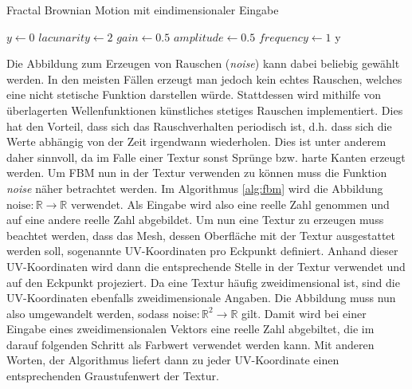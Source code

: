 \begin{algorithm}
  \caption{Fractal Brownian Motion mit eindimensionaler Eingabe}
  \label{alg:fbm}
  \SetAlgoLined


  \BlankLine
  $y \leftarrow 0$\;
  $\mathit{lacunarity}\leftarrow 2$\;
  $\mathit{gain}\leftarrow 0.5$\;
  \BlankLine
  $\mathit{amplitude}\leftarrow 0.5$\;
  $\mathit{frequency}\leftarrow 1$\;
  \BlankLine
  \BlankLine
  \Return y\;

\end{algorithm}

Die Abbildung zum Erzeugen von Rauschen (\textit{noise}) kann dabei beliebig
gewählt werden. In den meisten Fällen erzeugt man jedoch kein echtes Rauschen,
welches eine nicht stetische Funktion darstellen würde. Stattdessen wird
mithilfe von überlagerten Wellenfunktionen künstliches stetiges Rauschen
implementiert. Dies hat den Vorteil, dass sich das Rauschverhalten periodisch
ist, d.h. dass sich die Werte abhängig von der Zeit irgendwann wiederholen. Dies
ist unter anderem daher sinnvoll, da im Falle einer Textur sonst Sprünge bzw.
harte Kanten erzeugt werden. Um FBM nun in der Textur verwenden zu können muss
die Funktion \textit{noise} näher betrachtet werden. Im Algorithmus
\ref{alg:fbm} wird die Abbildung $\text{noise}: \mathbb{R} \to \mathbb{R}$
verwendet. Als Eingabe wird also eine reelle Zahl genommen und auf eine andere
reelle Zahl abgebildet. Um nun eine Textur zu erzeugen muss beachtet werden,
dass das Mesh, dessen Oberfläche mit der Textur ausgestattet werden soll,
sogenannte UV-Koordinaten pro Eckpunkt definiert. Anhand dieser UV-Koordinaten
wird dann die entsprechende Stelle in der Textur verwendet und auf den Eckpunkt
projeziert. Da eine Textur häufig zweidimensional ist, sind die UV-Koordinaten
ebenfalls zweidimensionale Angaben. Die Abbildung muss nun also umgewandelt
werden, sodass $\text{noise}: \mathbb{R}^2 \to \mathbb{R}$ gilt. Damit wird bei
einer Eingabe eines zweidimensionalen Vektors eine reelle Zahl abgebiltet, die
im darauf folgenden Schritt als Farbwert verwendet werden kann. Mit anderen
Worten, der Algorithmus liefert dann zu jeder UV-Koordinate einen entsprechenden
Graustufenwert der Textur.

